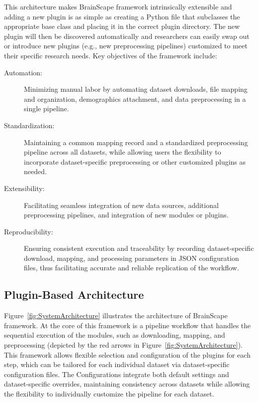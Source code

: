 This architecture makes BrainScape framework intrinsically extensible and adding a new plugin
is as simple as creating a Python file that subclasses the appropriate base class 
and placing it in the correct plugin directory. 
The new plugin will then be discovered automatically and 
researchers can easily swap out or introduce new plugins (e.g., new preprocessing pipelines) 
customized to meet their specific research needs.
Key objectives of the framework include: 
\begin{description}
    \item[Automation:] Minimizing manual labor by automating dataset downloads, file mapping and organization, demographics attachment, and data preprocessing in a single pipeline.
    \item[Standardization:] Maintaining a common mapping record and a standardized preprocessing pipeline across all datasets, while allowing users the flexibility to incorporate dataset-specific preprocessing or other customized plugins as needed.
    \item[Extensibility:] Facilitating seamless integration of new data sources, additional preprocessing pipelines, and integration of new modules or plugins. 
    \item[Reproducibility:] Ensuring consistent execution and traceability by recording dataset-specific download, mapping, and processing parameters in JSON configuration files, thus facilitating accurate and reliable replication of the workflow.
\end{description}


\subsection{Plugin-Based Architecture}

Figure~\ref{fig:SystemArchitecture} illustrates the architecture of BrainScape framework. 
At the core of this framework is a pipeline workflow that handles the sequential execution of the modules, 
such as downloading, mapping, and preprocessing (depicted by the red arrows in Figure~\ref{fig:SystemArchitecture}). 
This framework allows flexible selection and configuration of the plugins for each step, which can be tailored for 
each individual dataset via dataset-specific configuration files.
The Configurations integrate both default settings and dataset-specific overrides, maintaining consistency 
across datasets while allowing the flexibility to individually customize the pipeline for each dataset.


